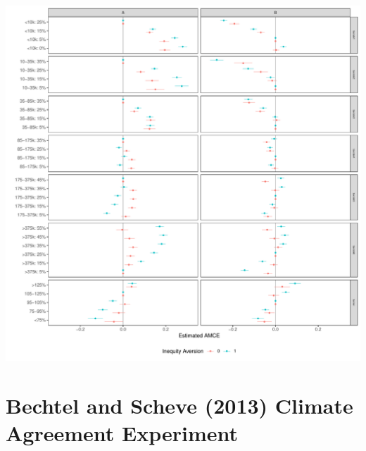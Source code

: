 \documentclass[a4paper,12pt]{article}\usepackage[]{graphicx}\usepackage[]{color}
\makeatletter
\def\maxwidth{ %
  \ifdim\Gin@nat@width>\linewidth
    \linewidth
  \else
    \Gin@nat@width
  \fi
}
\newenvironment{knitrout}{}{} %
\makeatother
\begin{document}
\begin{knitrout}
\color{fgcolor}
\includegraphics[width=\maxwidth]{figure/bms_subgroup_example_plot2-1} 

\end{knitrout}

\clearpage



\section{Bechtel and Scheve (2013) Climate Agreement Experiment}
\end{document}
